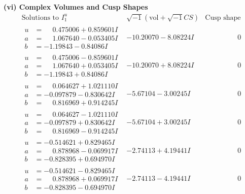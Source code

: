\documentclass[1p]{elsarticle_modified}
\theoremstyle{definition}
\newcommand{\I}{\sqrt{-1}}
\begin{document}
\newpage\flushleft \textbf{(vi) Complex Volumes and Cusp Shapes}
$$\begin{array}{c|c|c}  
\text{Solutions to }I^u_{1}& \I (\text{vol} + \sqrt{-1}CS) & \text{Cusp shape}\\
 \hline 
\begin{aligned}
u &= \phantom{-}0.475006 + 0.859601 I \\
a &= \phantom{-}1.067640 - 0.053405 I \\
b &= -1.19843 - 0.84086 I\end{aligned}
 & -10.20070 - 8.08224 I & \phantom{-0.000000 } 0 \\ \hline\begin{aligned}
u &= \phantom{-}0.475006 - 0.859601 I \\
a &= \phantom{-}1.067640 + 0.053405 I \\
b &= -1.19843 + 0.84086 I\end{aligned}
 & -10.20070 + 8.08224 I & \phantom{-0.000000 } 0 \\ \hline\begin{aligned}
u &= \phantom{-}0.064627 + 1.021110 I \\
a &= -0.097879 - 0.830642 I \\
b &= \phantom{-}0.816969 + 0.914245 I\end{aligned}
 & -5.67104 - 3.00245 I & \phantom{-0.000000 } 0 \\ \hline\begin{aligned}
u &= \phantom{-}0.064627 - 1.021110 I \\
a &= -0.097879 + 0.830642 I \\
b &= \phantom{-}0.816969 - 0.914245 I\end{aligned}
 & -5.67104 + 3.00245 I & \phantom{-0.000000 } 0 \\ \hline\begin{aligned}
u &= -0.514621 + 0.829465 I \\
a &= \phantom{-}0.878968 - 0.069917 I \\
b &= -0.828395 + 0.694970 I\end{aligned}
 & -2.74113 + 4.19441 I & \phantom{-0.000000 } 0 \\ \hline\begin{aligned}
u &= -0.514621 - 0.829465 I \\
a &= \phantom{-}0.878968 + 0.069917 I \\
b &= -0.828395 - 0.694970 I\end{aligned}
 & -2.74113 - 4.19441 I & \phantom{-0.000000 } 0 \\ \hline\begin{aligned}

\end{aligned}
\end{array}$$
\end{document}
